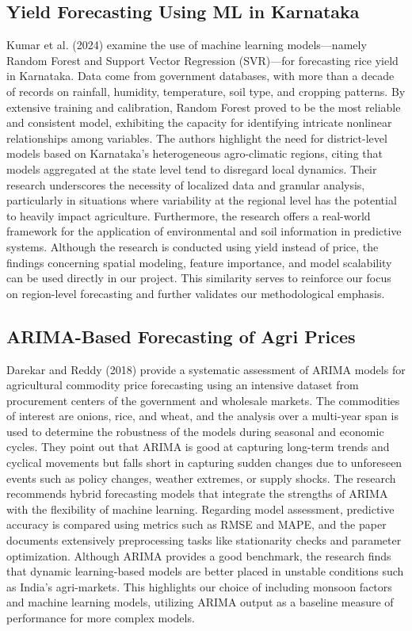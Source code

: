 \subsection{Yield Forecasting Using ML in Karnataka \cite{kumar2024yield}}
Kumar et al. (2024) examine the use of machine learning models—namely Random Forest and Support Vector Regression (SVR)—for forecasting rice yield in Karnataka. Data come from government databases, with more than a decade of records on rainfall, humidity, temperature, soil type, and cropping patterns. By extensive training and calibration, Random Forest proved to be the most reliable and consistent model, exhibiting the capacity for identifying intricate nonlinear relationships among variables. The authors highlight the need for district-level models based on Karnataka's heterogeneous agro-climatic regions, citing that models aggregated at the state level tend to disregard local dynamics. Their research underscores the necessity of localized data and granular analysis, particularly in situations where variability at the regional level has the potential to heavily impact agriculture. Furthermore, the research offers a real-world framework for the application of environmental and soil information in predictive systems. Although the research is conducted using yield instead of price, the findings concerning spatial modeling, feature importance, and model scalability can be used directly in our project. This similarity serves to reinforce our focus on region-level forecasting and further validates our methodological emphasis.

\subsection{ARIMA-Based Forecasting of Agri Prices \cite{darekar2018price}}
Darekar and Reddy (2018) provide a systematic assessment of ARIMA models for agricultural commodity price forecasting using an intensive dataset from procurement centers of the government and wholesale markets. The commodities of interest are onions, rice, and wheat, and the analysis over a multi-year span is used to determine the robustness of the models during seasonal and economic cycles. They point out that ARIMA is good at capturing long-term trends and cyclical movements but falls short in capturing sudden changes due to unforeseen events such as policy changes, weather extremes, or supply shocks. The research recommends hybrid forecasting models that integrate the strengths of ARIMA with the flexibility of machine learning. Regarding model assessment, predictive accuracy is compared using metrics such as RMSE and MAPE, and the paper documents extensively preprocessing tasks like stationarity checks and parameter optimization. Although ARIMA provides a good benchmark, the research finds that dynamic learning-based models are better placed in unstable conditions such as India's agri-markets. This highlights our choice of including monsoon factors and machine learning models, utilizing ARIMA output as a baseline measure of performance for more complex models.

